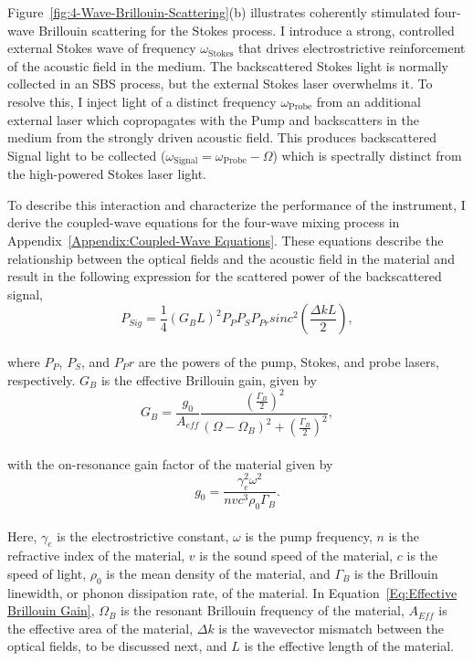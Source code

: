 Figure~\ref{fig:4-Wave-Brillouin-Scattering}(b) illustrates coherently stimulated four-wave Brillouin scattering for the Stokes process. I introduce a strong, controlled external Stokes wave of frequency \(\omega_{\mathrm{Stokes}}\) that drives electrostrictive reinforcement of the acoustic field in the medium. The backscattered Stokes light is normally collected in an SBS process, but the external Stokes laser overwhelms it. To resolve this, I inject light of a distinct frequency \(\omega_{\mathrm{Probe}}\) from an additional external laser which copropagates with the Pump and backscatters in the medium from the strongly driven acoustic field. This produces backscattered Signal light to be collected (\(\omega_{\mathrm{Signal}} = \omega_{\mathrm{Probe}} - \Omega\)) which is spectrally distinct from the high-powered Stokes laser light.

To describe this interaction and characterize the performance of the instrument, I derive the coupled-wave equations for the four-wave mixing process in Appendix~\ref{Appendix:Coupled-Wave Equations}. These equations describe the relationship between the optical fields and the acoustic field in the material and result in the following expression for the scattered power of the backscattered signal,
\\
\begin{equation}
  P_{Sig} = \frac{1}{4}(G_{B}L)^{2}P_{P}P_{S}P_{Pr}sinc^{2}\left(\frac{\Delta kL}{2}\right),
  \label{Eq:Theoretical Framework:Scattered Power}
\end{equation}
\\
where \(P_P\), \(P_S\), and \(P_Pr\) are the powers of the pump, Stokes, and probe lasers, respectively. \(G_B\) is the effective Brillouin gain, given by
\\
\begin{equation}
  G_{B} = \frac{g_{0}}{A_{eff}}\frac{\left(\frac{\Gamma_{B}}{2}\right)^{2}}{(\Omega - \Omega_{B})^{2} + \left(\frac{\Gamma_{B}}{2}\right)^{2}},
  \label{Eq:Effective Brillouin Gain}
\end{equation}
\\
with the on-resonance gain factor of the material given by
\\
\begin{equation}
  g_{0} = \frac{\gamma_{e}^{2}\omega^{2}}{nvc^{3}\rho_{0}\Gamma_{B}}.
\end{equation}
\\
Here, \(\gamma_e\) is the electrostrictive constant, \(\omega\) is the pump frequency, \(n\) is the refractive index of the material, \(v\) is the sound speed of the material, \(c\) is the speed of light, \(\rho_0\) is the mean density of the material, and \(\Gamma_B\) is the Brillouin linewidth, or phonon dissipation rate, of the material. In Equation~\ref{Eq:Effective Brillouin Gain}, \(\Omega_B\) is the resonant Brillouin frequency of the material, \(A_{Eff}\) is the effective area of the material, \(\Delta k\) is the wavevector mismatch between the optical fields, to be discussed next, and \(L\) is the effective length of the material.


